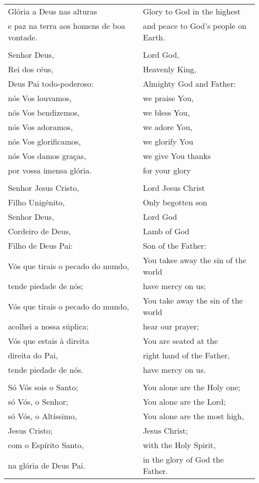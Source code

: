   \newpage


\begin{longtable}{L{1.7in}R{1.7in}}
  Glória a Deus nas alturas & { Glory to God in the highest}\\
  e paz na terra aos homens de boa vontade. & { and peace to God's people on Earth.}\\
  &\\
  Senhor Deus, & { Lord God,}\\
  Rei dos céus, & { Heavenly King,}\\
  Deus Pai todo-poderoso: & { Almighty God and Father:}\\
  nós Vos louvamos, & { we praise You,}\\
  nós Vos bendizemos, & { we bless You,}\\
  nós Vos adoramos, & { we adore You,}\\
  nós Vos glorificamos,& { we glorify You}\\
  nós Vos damos graças, & { we give You thanks}\\
  por vossa imensa glória. & { for your glory}\\
  &\\
  Senhor Jesus Cristo, & { Lord Jesus Christ}\\ 
  Filho Unigénito, & { Only begotten son}\\
  Senhor Deus, & { Lord God}\\
  Cordeiro de Deus, & { Lamb of God}\\ 
  Filho de Deus Pai: & { Son of the Father:}\\
  Vós que tirais o pecado do mundo, & { You takee away the sin of the world}\\ 
  tende piedade de nós; & { have mercy on us;}\\
  Vós que tirais o pecado do mundo, & { You take away the sin of the world}\\ 
  acolhei a nossa súplica; & { hear our prayer;}\\
  Vós que estais à direita & { You are seated at the}\\
  direita do Pai, & { right hand of the Father,}\\
  tende piedade de nós. & { have mercy on us.}\\
  &\\
  Só Vós sois o Santo; & { You alone are the Holy one;}\\
  só Vós, o Senhor; & { You alone are the Lord;}\\
  só Vós, o Altíssimo,& { You alone are the most high,}\\
  Jesus Cristo; & { Jesus Christ;}\\
  com o Espírito Santo,  & { with the Holy Spirit,}\\
  na glória de Deus Pai. & { in the glory of God the Father.}\\

\end{longtable}

